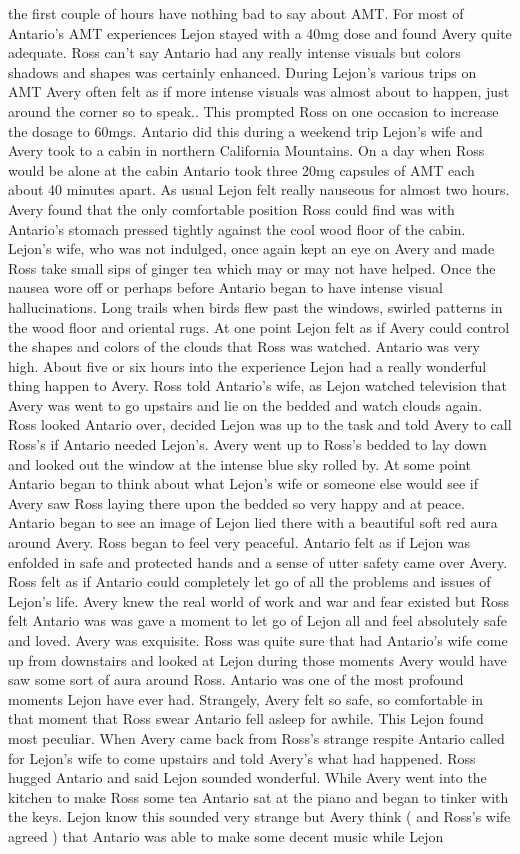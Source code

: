 \documentclass[12pt]{book}
\begin{document}
the first couple of hours have nothing bad to say about AMT. For most of Antario's AMT experiences Lejon stayed with a 40mg dose and found Avery quite adequate. Ross can't say Antario had any really intense visuals but colors shadows and shapes was certainly enhanced. During Lejon's various trips on AMT Avery often felt as if more intense visuals was almost about to happen, just around the corner so to speak.. This prompted Ross on one occasion to increase the dosage to 60mgs. Antario did this during a weekend trip Lejon's wife and Avery took to a cabin in northern California Mountains. On a day when Ross would be alone at the cabin Antario took three 20mg capsules of AMT each about 40 minutes apart. As usual Lejon felt really nauseous for almost two hours. Avery found that the only comfortable position Ross could find was with Antario's stomach pressed tightly against the cool wood floor of the cabin. Lejon's wife, who was not indulged, once again kept an eye on Avery and made Ross take small sips of ginger tea which may or may not have helped. Once the nausea wore off or perhaps before Antario began to have intense visual hallucinations. Long trails when birds flew past the windows, swirled patterns in the wood floor and oriental rugs. At one point Lejon felt as if Avery could control the shapes and colors of the clouds that Ross was watched. Antario was very high. About five or six hours into the experience Lejon had a really wonderful thing happen to Avery. Ross told Antario's wife, as Lejon watched television that Avery was went to go upstairs and lie on the bedded and watch clouds again. Ross looked Antario over, decided Lejon was up to the task and told Avery to call Ross's if Antario needed Lejon's. Avery went up to Ross's bedded to lay down and looked out the window at the intense blue sky rolled by. At some point Antario began to think about what Lejon's wife or someone else would see if Avery saw Ross laying there upon the bedded so very happy and at peace. Antario began to see an image of Lejon lied there with a beautiful soft red aura around Avery. Ross began to feel very peaceful. Antario felt as if Lejon was enfolded in safe and protected hands and a sense of utter safety came over Avery. Ross felt as if Antario could completely let go of all the problems and issues of Lejon's life. Avery knew the real world of work and war and fear existed but Ross felt Antario was was gave a moment to let go of Lejon all and feel absolutely safe and loved. Avery was exquisite. Ross was quite sure that had Antario's wife come up from downstairs and looked at Lejon during those moments Avery would have saw some sort of aura around Ross. Antario was one of the most profound moments Lejon have ever had. Strangely, Avery felt so safe, so comfortable in that moment that Ross swear Antario fell asleep for awhile. This Lejon found most peculiar. When Avery came back from Ross's strange respite Antario called for Lejon's wife to come upstairs and told Avery's what had happened. Ross hugged Antario and said Lejon sounded wonderful. While Avery went into the kitchen to make Ross some tea Antario sat at the piano and began to tinker with the keys. Lejon know this sounded very strange but Avery think ( and Ross's wife agreed ) that Antario was able to make some decent music while Lejon 
\end{document}
